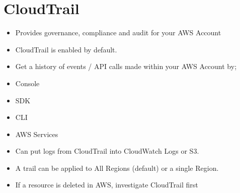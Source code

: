 \section{CloudTrail}
\begin{itemize}
    \item Provides governance, compliance and audit for your AWS Account
    \item CloudTrail is enabled by default.
    \item Get a history of events / API calls made within your AWS Account by;
    \item Console
    \item SDK
    \item CLI
    \item AWS Services
    \item Can put logs from CloudTrail into CloudWatch Logs or S3.
    \item A trail can be applied to All Regions (default) or a single Region.
    \item If a resource is deleted in AWS, investigate CloudTrail first
\end{itemize}


